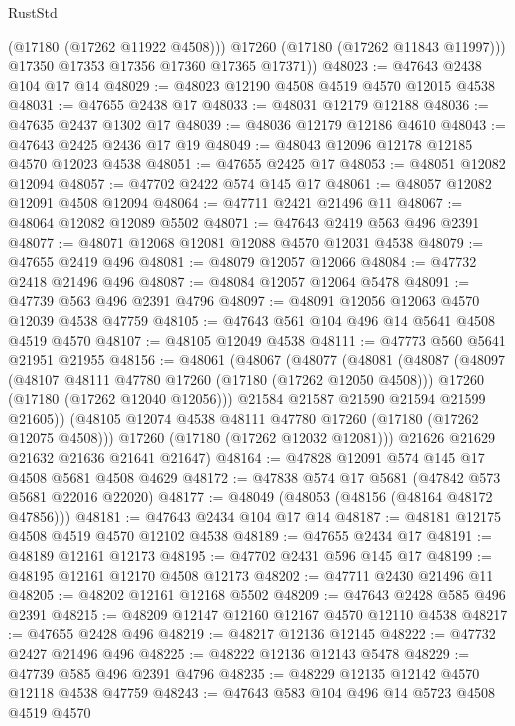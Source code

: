 \begin{lexlean}{RustStd}
\begin{coremodule}
            (@17180 (@17262 @11922 @4508)))
          @17260
          (@17180 (@17262 @11843 @11997)))
        @17350
        @17353
        @17356
        @17360
        @17365
        @17371))
@48023 := @47643 @2438 @104 @17 @14
@48029 := @48023 @12190 @4508 @4519 @4570 @12015 @4538
@48031 := @47655 @2438 @17
@48033 := @48031 @12179 @12188
@48036 := @47635 @2437 @1302 @17
@48039 := @48036 @12179 @12186 @4610
@48043 := @47643 @2425 @2436 @17 @19
@48049 := @48043 @12096 @12178 @12185 @4570 @12023 @4538
@48051 := @47655 @2425 @17
@48053 := @48051 @12082 @12094
@48057 := @47702 @2422 @574 @145 @17
@48061 := @48057 @12082 @12091 @4508 @12094
@48064 := @47711 @2421 @21496 @11
@48067 := @48064 @12082 @12089 @5502
@48071 := @47643 @2419 @563 @496 @2391
@48077 := @48071 @12068 @12081 @12088 @4570 @12031 @4538
@48079 := @47655 @2419 @496
@48081 := @48079 @12057 @12066
@48084 := @47732 @2418 @21496 @496
@48087 := @48084 @12057 @12064 @5478
@48091 := @47739 @563 @496 @2391 @4796
@48097 := @48091 @12056 @12063 @4570 @12039 @4538 @47759
@48105 := @47643 @561 @104 @496 @14 @5641 @4508 @4519 @4570
@48107 := @48105 @12049 @4538
@48111 := @47773 @560 @5641 @21951 @21955
@48156 := @48061
    (@48067
      (@48077
        (@48081
          (@48087
            (@48097
              (@48107 @48111 @47780 @17260 (@17180 (@17262 @12050 @4508)))
              @17260
              (@17180 (@17262 @12040 @12056)))
            @21584
            @21587
            @21590
            @21594
            @21599
            @21605))
        (@48105 @12074 @4538 @48111 @47780 @17260 (@17180 (@17262 @12075 @4508)))
        @17260
        (@17180 (@17262 @12032 @12081)))
      @21626
      @21629
      @21632
      @21636
      @21641
      @21647)
@48164 := @47828 @12091 @574 @145 @17 @4508 @5681 @4508 @4629
@48172 := @47838 @574 @17 @5681 (@47842 @573 @5681 @22016 @22020)
@48177 := @48049 (@48053 (@48156 (@48164 @48172 @47856)))
@48181 := @47643 @2434 @104 @17 @14
@48187 := @48181 @12175 @4508 @4519 @4570 @12102 @4538
@48189 := @47655 @2434 @17
@48191 := @48189 @12161 @12173
@48195 := @47702 @2431 @596 @145 @17
@48199 := @48195 @12161 @12170 @4508 @12173
@48202 := @47711 @2430 @21496 @11
@48205 := @48202 @12161 @12168 @5502
@48209 := @47643 @2428 @585 @496 @2391
@48215 := @48209 @12147 @12160 @12167 @4570 @12110 @4538
@48217 := @47655 @2428 @496
@48219 := @48217 @12136 @12145
@48222 := @47732 @2427 @21496 @496
@48225 := @48222 @12136 @12143 @5478
@48229 := @47739 @585 @496 @2391 @4796
@48235 := @48229 @12135 @12142 @4570 @12118 @4538 @47759
@48243 := @47643 @583 @104 @496 @14 @5723 @4508 @4519 @4570

\end{coremodule}
\end{lexlean}
